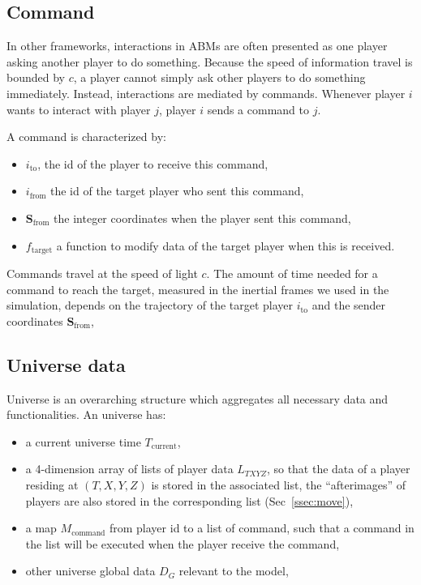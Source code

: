 \documentclass{svproc}
\begin{document}
\subsection{Command}

In other frameworks, interactions in ABMs are often presented as one player asking another player to do something.
Because the speed of information travel is bounded by $c$,
a player cannot simply ask other players to do something immediately.
Instead, interactions are mediated by commands.
Whenever player $i$ wants to interact with player $j$, 
player $i$ sends a command to $j$. 

A command is characterized by:
\begin{itemize}
  \item $i_{\textrm{to}}$, the id of the player to receive this command,
  \item $i_{\textrm{from}}$ the id of the target player who sent this command,
  \item $\textbf{S}_{\textrm{from}}$ the integer coordinates when the player sent this command,
  \item $f_{\text{target}}$ a function to modify data of the target player when this is received.
\end{itemize}

Commands travel at the speed of light $c$.
The amount of time needed for a command to reach the target, 
measured in the inertial frames we used in the simulation,
depends on the trajectory of the target player $i_{\textrm{to}}$ and the sender coordinates $\textbf{S}_{\textrm{from}}$,

\subsection{Universe data}

Universe is an overarching structure which aggregates all necessary data and functionalities.
An universe has:
\begin{itemize}
  \item a current universe time $T_{\textrm{current}}$,
  \item a 4-dimension array of lists of player data $L_{TXYZ}$,
        so that the data of a player residing at $(T, X, Y, Z)$ is stored in the associated list, 
        the ``afterimages'' of players are also stored in the corresponding list (Sec~\ref{ssec:move}),
  \item a map $M_{\textrm{command}}$ from player id to a list of command,
        such that a command in the list will be executed when the player receive the command,
  \item other universe global data $D_G$ relevant to the model,
\end{itemize}
\end{document}
